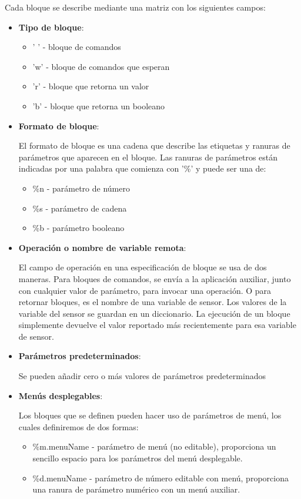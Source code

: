 Cada bloque se describe mediante una matriz con los siguientes campos:
\begin{itemize}
\item \textbf{Tipo de bloque}:

\begin{itemize}
\item ' ' - bloque de comandos
\item 'w' - bloque de comandos que esperan
\item 'r' - bloque que retorna un valor
\item 'b' - bloque que retorna un booleano 
\end{itemize}
\item \textbf{Formato de bloque}:

El formato de bloque es una cadena que describe las etiquetas y ranuras de parámetros que aparecen en el bloque.
Las ranuras de parámetros están indicadas por una palabra que comienza con '\%' y puede ser una de:
\begin{itemize}
\item \%n -  parámetro de número 
\item \%s - parámetro de cadena 
\item \%b - parámetro booleano
\end{itemize}
\item \textbf{Operación o nombre de variable remota}:

El campo de operación en una especificación de bloque se usa de dos maneras. Para bloques de comandos, se envía a la aplicación auxiliar, junto con cualquier valor de parámetro, para invocar una operación. O para retornar bloques, es el nombre de una variable de sensor. Los valores de la variable del sensor se guardan en un diccionario. La ejecución de un bloque simplemente devuelve el valor reportado más recientemente para esa variable de sensor.
\item \textbf{Parámetros predeterminados}:

Se pueden añadir cero o más valores de parámetros predeterminados

\item \textbf{Menús desplegables}:

Los bloques que se definen pueden hacer uso de parámetros de menú, los cuales definiremos de dos formas:
\begin{itemize}
\item \%m.menuName - parámetro de menú (no editable), proporciona un sencillo espacio para los parámetros del menú desplegable.
\item \%d.menuName - parámetro de número editable con menú, proporciona una ranura de parámetro numérico con un menú auxiliar.
\end{itemize}
\end{itemize}

